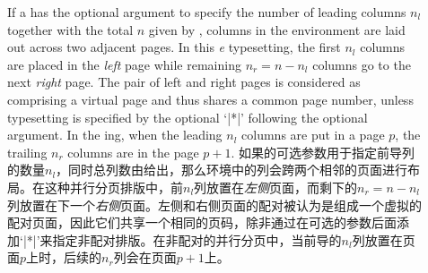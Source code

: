 \begin{description}
\item[]\mbox{}
\mbox{}\par
{}
\begin{paracol}{2}
If a \beginparacol{} has the optional  argument to specify
the number of leading columns $n_l$ together with the total $n$ given by
, columns in the environment are laid out across two adjacent
pages.  In this {\em\Uidx\parapag{}e} typesetting, the first $n_l$ columns
are placed in the {\em left} page while remaining $n_r=n-n_l$ columns go to
the next {\em right} page.  The pair of left and right pages is
considered as comprising a virtual {\em\Uidx\paired} page and thus shares
a common page number, unless {\em\Uidx\npaired} typesetting is specified
by the optional `|*|' following the optional  argument.  In
the \npaired{} \parapag{}ing, when the leading $n_l$ columns are put in a
page $p$, the trailing $n_r$ columns are in the page $p+1$.
\switchcolumn
如果\beginparacol{}的可选参数用于指定前导列的数量$n_l$，同时总列数由给出，那么环境中的列会跨两个相邻的页面进行布局。在这种{\fontKai 并行分页}排版中，前$n_l$列放置在{\em 左侧}页面，而剩下的$n_r=n-n_l$列放置在下一个{\em 右侧}页面。左侧和右侧页面的配对被认为是组成一个虚拟的{\fontKai 配对}页面，因此它们共享一个相同的页码，除非通过在可选的参数后面添加`|*|'来指定{\fontKai 非配对}排版。在{\fontKai 非配对的并行分页}中，当前导的$n_l$列放置在页面$p$上时，后续的$n_r$列会在页面$p+1$上。
\end{paracol}

\begin{itemize}
\end{itemize}
\end{description}
